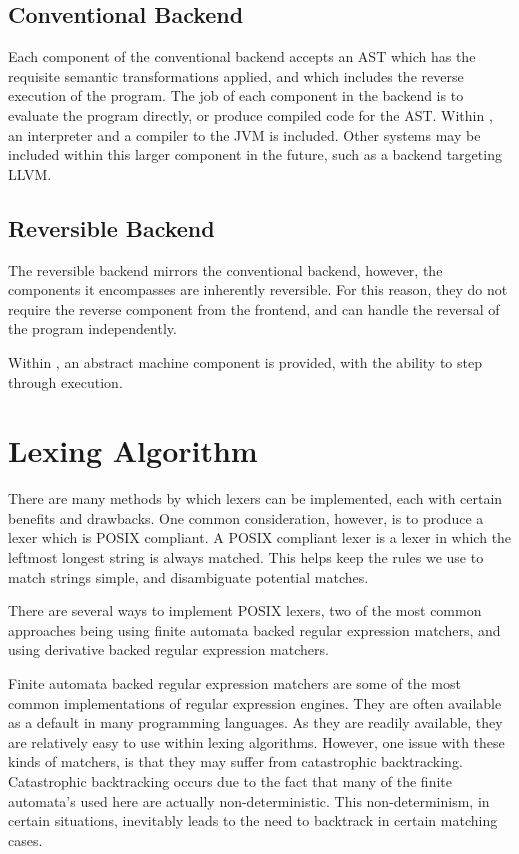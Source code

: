 \subsection{Conventional Backend}

Each component of the conventional backend accepts an AST which has the requisite semantic transformations applied, and which includes the reverse execution of the program. The job of each component in the backend is to evaluate the program directly, or produce compiled code for the AST.
Within \rimp, an interpreter and a compiler to the JVM is included. Other systems may be included within this larger component in the future, such as a backend targeting LLVM.

\subsection{Reversible Backend}

The reversible backend mirrors the conventional backend, however, the components it encompasses are inherently reversible. For this reason, they do not require the reverse component from the frontend, and can handle the reversal of the program independently.

Within \rimp, an abstract machine component is provided, with the ability to step through execution. 

\section{Lexing Algorithm}

There are many methods by which lexers can be implemented, each with certain benefits and drawbacks. One common consideration, however, is to produce a lexer which is POSIX compliant. A POSIX compliant lexer is a lexer in which the leftmost longest string is always matched\cite{POSIX}. This helps keep the rules we use to match strings simple, and disambiguate potential matches.

There are several ways to implement POSIX lexers, two of the most common approaches being using finite automata backed regular expression matchers\cite{LexGenerator, RegularExpressionsToFA}, and using derivative backed regular expression matchers\cite{UrbanposixDerivatives, SulzmanPosix}.

Finite automata backed regular expression matchers are some of the most common implementations of regular expression engines. They are often available as a default in many programming languages\cite{PythonRe, V8Re}. As they are readily available, they are relatively easy to use within lexing algorithms. However, one issue with these kinds of matchers, is that they may suffer from catastrophic backtracking. Catastrophic backtracking occurs due to the fact that many of the finite automata's used here are actually non-deterministic. This non-determinism, in certain situations, inevitably leads to the need to backtrack in certain matching cases. 

